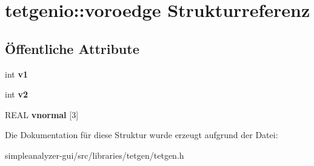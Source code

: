 \hypertarget{structtetgenio_1_1voroedge}{\section{tetgenio\-:\-:voroedge Strukturreferenz}
\label{structtetgenio_1_1voroedge}
}
\subsection*{Öffentliche Attribute}
\begin{DoxyCompactItemize}
\item 
\hypertarget{structtetgenio_1_1voroedge_a2c18bda2392af5f81bc790a2c0ea3139}{int {\bfseries v1}}\label{structtetgenio_1_1voroedge_a2c18bda2392af5f81bc790a2c0ea3139}

\item 
\hypertarget{structtetgenio_1_1voroedge_a19a27882ca68a89123965f7b08e05d55}{int {\bfseries v2}}\label{structtetgenio_1_1voroedge_a19a27882ca68a89123965f7b08e05d55}

\item 
\hypertarget{structtetgenio_1_1voroedge_afea78ad75784a868068e6d86c21531a3}{R\-E\-A\-L {\bfseries vnormal} \mbox{[}3\mbox{]}}\label{structtetgenio_1_1voroedge_afea78ad75784a868068e6d86c21531a3}

\end{DoxyCompactItemize}


Die Dokumentation für diese Struktur wurde erzeugt aufgrund der Datei\-:\begin{DoxyCompactItemize}
\item 
simpleanalyzer-\/gui/src/libraries/tetgen/tetgen.\-h\end{DoxyCompactItemize}
